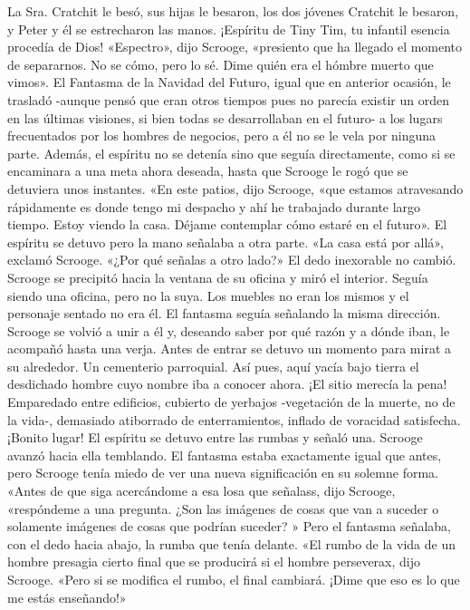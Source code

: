 \documentclass{novela}
\begin{document}
 La Sra. Cratchit le besó, sus hijas le besaron, los dos jóvenes Cratchit le besaron, y Peter y él se estrecharon las manos. ¡Espíritu de Tiny Tim, tu infantil esencia procedía de Dios!
 «Espectro», dijo Scrooge, «presiento que ha llegado el momento de separarnos. No se cómo, pero lo sé. Dime quién era el hómbre muerto que vimos».
 El Fantasma de la Navidad del Futuro, igual que en anterior ocasión, le trasladó -aunque pensó que eran otros tiempos pues no parecía existir un orden en las últimas visiones, si bien todas se desarrollaban en el futuro- a los lugars frecuentados por los hombres de negocios, pero a él no se le vela por ninguna parte. Además, el espíritu no se detenía sino que seguía directamente, como si se encaminara a una meta ahora deseada, hasta que Scrooge le rogó que se detuviera unos instantes.
 «En este patios, dijo Scrooge, «que estamos atravesando rápidamente es donde tengo mi despacho y ahí he trabajado durante largo tiempo. Estoy viendo la casa. Déjame contemplar cómo estaré en el futuro».
 El espíritu se detuvo pero la mano señalaba a otra parte.
 «La casa está por allá», exclamó Scrooge. «¿Por qué señalas a otro lado?»
 El dedo inexorable no cambió.
 Scrooge se precipitó hacia la ventana de su oficina y miró el interior. Seguía siendo una oficina, pero no la suya. Los muebles no eran los mismos y el personaje sentado no era él. El fantasma seguía señalando la misma dirección.
 Scrooge se volvió a unir a él y, deseando saber por qué razón y a dónde iban, le acompañó hasta una verja. Antes de entrar se detuvo un momento para mirat a su alrededor.
 Un cementerio parroquial. Así pues, aquí yacía bajo tierra el desdichado hombre cuyo nombre iba a conocer ahora. ¡El sitio merecía la pena! Emparedado entre edificios, cubierto de yerbajos -vegetación de la muerte, no de la vida-, demasiado atiborrado de enterramientos, inflado de voracidad satisfecha. ¡Bonito lugar!
 El espíritu se detuvo entre las rumbas y señaló una. Scrooge avanzó hacia ella temblando. El fantasma estaba exactamente igual que antes, pero Scrooge tenía miedo de ver una nueva significación en su solemne forma.
 «Antes de que siga acercándome a esa losa que señalass, dijo Scrooge, «respóndeme a una pregunta. ¿Son las imágenes de cosas que van a suceder o solamente imágenes de cosas que podrían suceder? »
 Pero el fantasma señalaba, con el dedo hacia abajo, la rumba que tenía delante.
 «El rumbo de la vida de un hombre presagia cierto final que se producirá si el hombre perseverax, dijo Scrooge. «Pero si se modifica el rumbo, el final cambiará. ¡Dime que eso es lo que me estás enseñando!»
\end{document}
